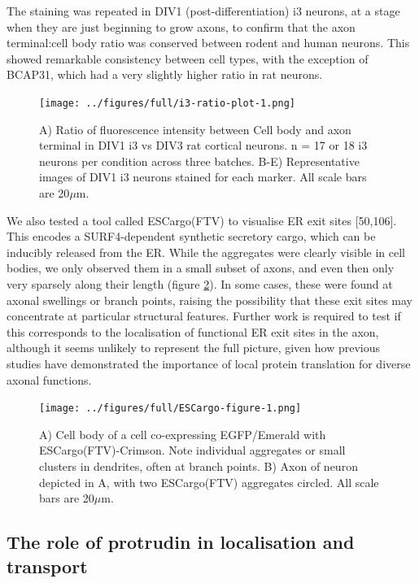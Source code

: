 \documentclass[
  12pt,
  a4paper,
]{book}
\begin{document}
The staining was repeated in DIV1 (post-differentiation) i3 neurons, at a stage when they are just beginning to grow axons, to confirm that the axon terminal:cell body ratio was conserved between rodent and human neurons. This showed remarkable consistency between cell types, with the exception of BCAP31, which had a very slightly higher ratio in rat neurons.

\begin{figure}
\centering
\texttt{[image: ../figures/full/i3-ratio-plot-1.png]}
\caption{\label{fig:i3-ratio-plot}A) Ratio of fluorescence intensity between Cell body and axon terminal in DIV1 i3 vs DIV3 rat cortical neurons. n = 17 or 18 i3 neurons per condition across three batches. B-E) Representative images of DIV1 i3 neurons stained for each marker. All scale bars are 20\(\mu\)m.}
\end{figure}

We also tested a tool called ESCargo(FTV) to visualise ER exit sites {[}50,106{]}. This encodes a SURF4-dependent synthetic secretory cargo, which can be inducibly released from the ER. While the aggregates were clearly visible in cell bodies, we only observed them in a small subset of axons, and even then only very sparsely along their length (figure \ref{fig:ESCargo-figure}). In some cases, these were found at axonal swellings or branch points, raising the possibility that these exit sites may concentrate at particular structural features. Further work is required to test if this corresponds to the localisation of functional ER exit sites in the axon, although it seems unlikely to represent the full picture, given how previous studies have demonstrated the importance of local protein translation for diverse axonal functions.

\begin{figure}
\centering
\texttt{[image: ../figures/full/ESCargo-figure-1.png]}
\caption{\label{fig:ESCargo-figure}A) Cell body of a cell co-expressing EGFP/Emerald with ESCargo(FTV)-Crimson. Note individual aggregates or small clusters in dendrites, often at branch points. B) Axon of neuron depicted in A, with two ESCargo(FTV) aggregates circled. All scale bars are 20\(\mu\)m.}
\end{figure}

\hypertarget{the-role-of-protrudin-in-localisation-and-transport}{%
\subsection{The role of protrudin in localisation and transport}\label{the-role-of-protrudin-in-localisation-and-transport}}
\end{document}
